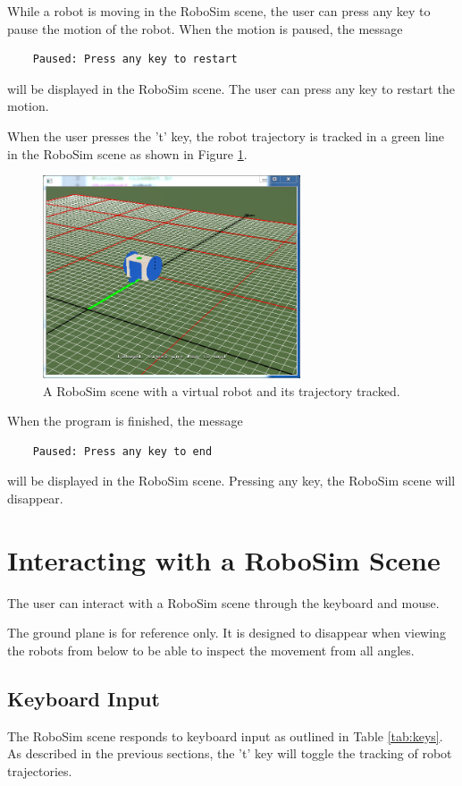 \documentclass{article}
\begin{document}
While a robot is moving in the RoboSim scene, the user can press any key to
pause the motion of the robot.  When the motion is paused, the message
\begin{verbatim}
    Paused: Press any key to restart
\end{verbatim}
will be displayed in the RoboSim scene. The user can press any key to restart
the motion.

When the user presses the 't' key, the robot trajectory is tracked in a green
line in the RoboSim scene as shown in Figure \ref{fig:robosim_tracked}.
\begin{figure}[H]
	\begin{center}
		\includegraphics[width=3in]{images/robosim_tracked}
	\end{center}
	\caption{A RoboSim scene with a virtual robot and its trajectory tracked.}
	\label{fig:robosim_tracked}
\end{figure}

When the program is finished, the message
\begin{verbatim}
    Paused: Press any key to end
\end{verbatim}
will be displayed in the RoboSim scene.  Pressing any key, the RoboSim scene
will disappear.

\section{Interacting with a RoboSim Scene}
The user can interact with a RoboSim scene through the keyboard and mouse.

The ground plane is for reference only.  It is designed to disappear when
viewing the robots from below to be able to inspect the movement from all
angles.

\subsection{Keyboard Input}
The RoboSim scene responds to keyboard input as outlined in Table
\ref{tab:keys}.  As described in the previous sections,
the 't' key will toggle the tracking of robot trajectories.
\end{document}
